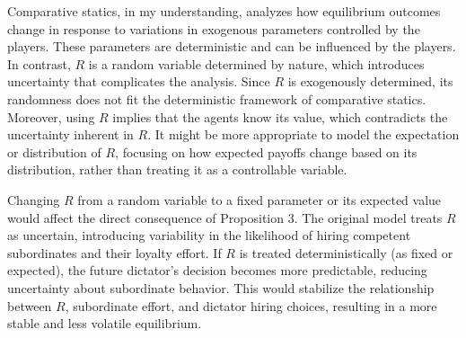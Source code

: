 \documentclass[11pt]{article}    %
\begin{document}
Comparative statics, in my understanding, analyzes how equilibrium outcomes change in response to variations in exogenous parameters controlled by the players. These parameters are deterministic and can be influenced by the players. In contrast, $R$ is a random variable determined by nature, which introduces uncertainty that complicates the analysis. Since $R$ is exogenously determined, its randomness does not fit the deterministic framework of comparative statics. Moreover, using $R$ implies that the agents know its value, which contradicts the uncertainty inherent in $R$. It might be more appropriate to model the expectation or distribution of $R$, focusing on how expected payoffs change based on its distribution, rather than treating it as a controllable variable.

Changing $R$ from a random variable to a fixed parameter or its expected value would affect the direct consequence of Proposition 3. The original model treats $R$ as uncertain, introducing variability in the likelihood of hiring competent subordinates and their loyalty effort. If $R$ is treated deterministically (as fixed or expected), the future dictator’s decision becomes more predictable, reducing uncertainty about subordinate behavior. This would stabilize the relationship between $R$, subordinate effort, and dictator hiring choices, resulting in a more stable and less volatile equilibrium.
\end{document}
